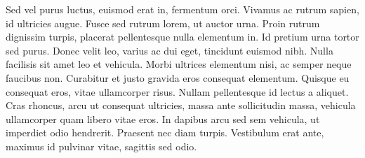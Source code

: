 \documentclass[twoside]{article}
\begin{document}
 Sed vel purus luctus, euismod erat in, fermentum orci.
 Vivamus ac rutrum sapien, id ultricies augue.
 Fusce sed rutrum lorem, ut auctor urna.
 Proin rutrum dignissim turpis, placerat pellentesque nulla elementum in.
 Id pretium urna tortor sed purus.
 Donec velit leo, varius ac dui eget, tincidunt euismod nibh.
 Nulla facilisis sit amet leo et vehicula.
 Morbi ultrices elementum nisi, ac semper neque faucibus non.
 Curabitur et justo gravida eros consequat elementum.
 Quisque eu consequat eros, vitae ullamcorper risus.
 Nullam pellentesque id lectus a aliquet.
 Cras rhoncus, arcu ut consequat ultricies, massa ante sollicitudin massa, vehicula ullamcorper quam libero vitae eros.
 In dapibus arcu sed sem vehicula, ut imperdiet odio hendrerit.
 Praesent nec diam turpis.
 Vestibulum erat ante, maximus id pulvinar vitae, sagittis sed odio.
\pend
\endnumbering
\newpage

\newcommand{\autoversenumber}{%
  \refstepcounter{verse}%
  \edef\tmp{\noexpand\markboth{\the\value{verse}}{\the\value{verse}}}%
  \expandafter\doinsidethislinehook\expandafter{\tmp}%
  \textbf{\theverse}.\space%
}
\end{document}
